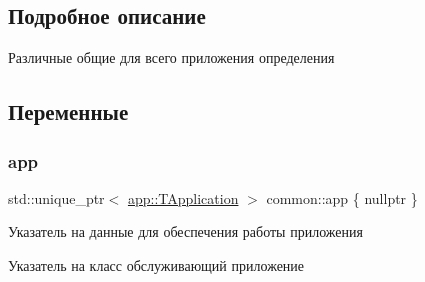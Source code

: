\subsection{Подробное описание}
Различные общие для всего приложения определения 

\subsection{Переменные}
\mbox{\label{namespacecommon_afb09e0e369090296753bc8e2d0274823}} 
\subsubsection{\texorpdfstring{app}{app}}
{\footnotesize\ttfamily std\+::unique\+\_\+ptr$<$ \hyperlink{classapp_1_1_t_application}{app\+::\+T\+Application} $>$ common\+::app \{ nullptr \}}



Указатель на данные для обеспечения работы приложения 

Указатель на класс обслуживающий приложение 